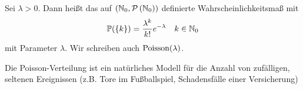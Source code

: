 \begin{definition}
	Sei $\lambda >0$. Dann heißt das auf $(\mathbb{N}_{0}, \mathcal{P}\left( \mathbb{N}_{0} \right))$ definierte Wahrscheinlichkeitsmaß mit
	\begin{equation*}
		\mathbb{P}(\left\{ k \right\}) = \frac{\lambda^k}{k!}e^{-\lambda} \quad k \in \mathbb{N}_{0}
	\end{equation*}
	 mit Parameter $\lambda$. Wir schreiben auch $\operatorname{Poisson}(\lambda)$.
\end{definition}

Die Poisson-Verteilung ist ein natürliches Modell für die Anzahl von zufälligen, seltenen Ereignissen (z.B. Tore im Fußballspiel, Schadensfälle einer Versicherung)
